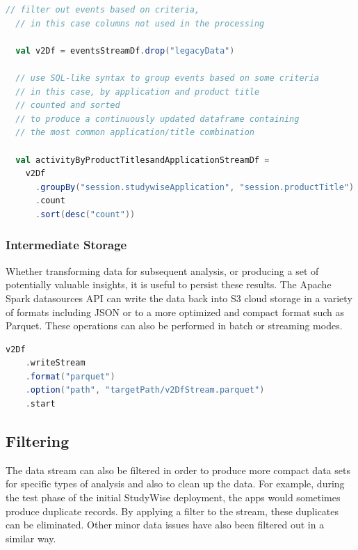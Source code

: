\documentclass[runningheads,a4paper]{llncs}
\begin{document}
\begin{lstlisting}[language=Scala, basicstyle = \small, caption={Filtering out unwanted data fields}]
  // filter out events based on criteria, 
  // in this case columns not used in the processing
  
  val v2Df = eventsStreamDf.drop("legacyData")

  // use SQL-like syntax to group events based on some criteria
  // in this case, by application and product title
  // counted and sorted
  // to produce a continuously updated dataframe containing 
  // the most common application/title combination
  
  val activityByProductTitlesandApplicationStreamDf = 
    v2Df
      .groupBy("session.studywiseApplication", "session.productTitle")
      .count
      .sort(desc("count"))
\end{lstlisting}%

\subsubsection{Intermediate Storage}
Whether transforming data for subsequent analysis, or producing a set of potentially valuable insights, it is useful to persist these results. The Apache Spark datasources API can write the data back into S3 cloud storage in a variety of formats including JSON or to a more optimized and compact format such as Parquet. These operations can also be performed in batch or streaming modes.

\begin{lstlisting}[language=Scala, basicstyle = \small, caption={Creating a Parquet File from raw JSON data}]
  v2Df
    .writeStream
    .format("parquet")
    .option("path", "targetPath/v2DfStream.parquet")
    .start
\end{lstlisting}%

\subsection{Filtering}

The data stream can also be filtered in order to produce more compact data sets for specific types of analysis and also to clean up the data.  For example, during the test phase of the initial StudyWise deployment, the apps would sometimes produce duplicate records.  By applying a filter to the stream, these duplicates can be eliminated.  Other minor data issues have also been filtered out in a similar way.
\end{document}
